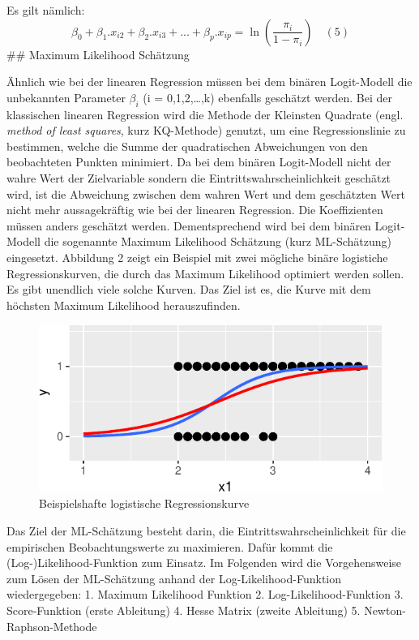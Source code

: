 \documentclass[12pt,]{article}
\begin{document}
Es gilt nämlich: \[
\beta_0 + \beta_1.x_{i2} + \beta_2.x_{i3} + ... + \beta_p.x_{ip} = \ln(\frac{\pi_i}{1-\pi_i}) \quad (5)
\] \#\# Maximum Likelihood Schätzung

Ähnlich wie bei der linearen Regression müssen bei dem binären
Logit-Modell die unbekannten Parameter \(\beta_i\) (i =
0,1,2,\ldots{},k) ebenfalls geschätzt werden. Bei der klassischen
linearen Regression wird die Methode der Kleinsten Quadrate (engl.
\emph{method of least squares}, kurz KQ-Methode) genutzt, um eine
Regressionslinie zu bestimmen, welche die Summe der quadratischen
Abweichungen von den beobachteten Punkten minimiert. Da bei dem binären
Logit-Modell nicht der wahre Wert der Zielvariable sondern die
Eintrittswahrscheinlichkeit geschätzt wird, ist die Abweichung zwischen
dem wahren Wert und dem geschätzten Wert nicht mehr aussagekräftig wie
bei der linearen Regression. Die Koeffizienten müssen anders geschätzt
werden. Dementsprechend wird bei dem binären Logit-Modell die sogenannte
Maximum Likelihood Schätzung (kurz ML-Schätzung) eingesetzt. Abbildung 2
zeigt ein Beispiel mit zwei mögliche binäre logistiche
Regressionskurven, die durch das Maximum Likelihood optimiert werden
sollen. Es gibt unendlich viele solche Kurven. Das Ziel ist es, die
Kurve mit dem höchsten Maximum Likelihood herauszufinden.

\begin{figure}[h]

{\centering \includegraphics{logisticRegression_files/figure-latex/unnamed-chunk-2-1} 

}

\caption{Beispielshafte logistische Regressionskurve}\label{fig:unnamed-chunk-2}
\end{figure}

Das Ziel der ML-Schätzung besteht darin, die Eintrittswahrscheinlichkeit
für die empirischen Beobachtungswerte zu maximieren. Dafür kommt die
(Log-)Likelihood-Funktion zum Einsatz. Im Folgenden wird die
Vorgehensweise zum Lösen der ML-Schätzung anhand der
Log-Likelihood-Funktion wiedergegeben: 1. Maximum Likelihood Funktion 2.
Log-Likelihood-Funktion 3. Score-Funktion (erste Ableitung) 4. Hesse
Matrix (zweite Ableitung) 5. Newton-Raphson-Methode
\end{document}

